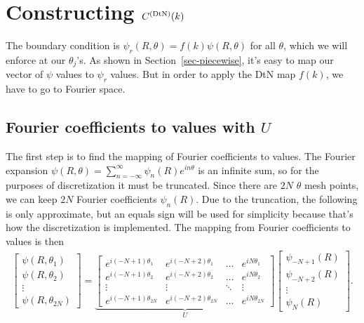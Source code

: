 \section{Constructing $C^{(\text{DtN})}(k)$}
\label{sec-dtnC}

The boundary condition is
$\psi_r(R,\theta) = f(k)\psi(R,\theta)$ for all $\theta$, which
we will enforce at our $\theta_j$'s.
As shown in Section~\ref{sec-piecewise},
it's easy to map our vector of $\psi$ values to $\psi_r$ values.
But in order to apply the DtN map $f(k)$, we have to go to
Fourier space.

\subsection{Fourier coefficients to values with $U$}

The first step is to find the mapping of Fourier coefficients to values.
The Fourier expansion 
$\psi(R,\theta) = \sum_{n=-\infty}^\infty \psi_n(R)e^{in\theta}$
is an infinite sum, so for the purposes of discretization 
it must be truncated. Since there are
$2N$ $\theta$ mesh points, we can keep $2N$ Fourier coefficients
$\psi_n(R)$. Due to the truncation, the following is only
approximate, but an equals sign will be used for simplicity because that's
how the discretization is implemented. The mapping from Fourier coefficients
to values is then
\begin{align*}
 \begin{bmatrix}
  \psi(R,\theta_1) \\ \psi(R,\theta_2) \\ \vdots \\ \psi(R,\theta_{2N})
 \end{bmatrix}
 =
 \underbrace{
 \begin{bmatrix}
  e^{i(-N+1)\theta_1}    & e^{i(-N+2)\theta_1}    & \hdots & e^{iN\theta_1} \\
  e^{i(-N+1)\theta_2}    & e^{i(-N+2)\theta_2}    & \hdots & e^{iN\theta_2} \\ 
        \vdots           & \vdots                 & \ddots &      \vdots    \\
  e^{i(-N+1)\theta_{2N}} & e^{i(-N+2)\theta_{2N}} & \hdots & e^{iN\theta_{2N}}
 \end{bmatrix}
 }_U
 \begin{bmatrix}
  \psi_{-N + 1}(R) \\ \psi_{-N+2}(R) \\ \vdots \\ \psi_{N}(R)
 \end{bmatrix}.
\end{align*}

